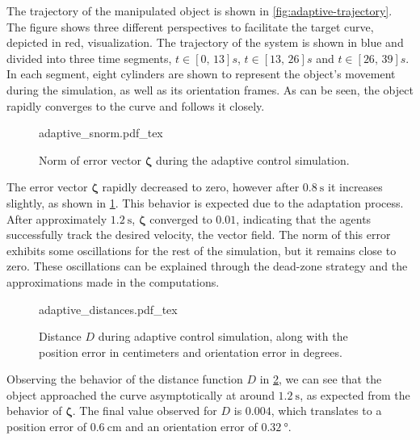 The trajectory of the manipulated object is shown in \cref{fig:adaptive-trajectory}. The figure shows three different perspectives to facilitate the target curve, depicted in red, visualization. The trajectory of the system is shown in blue and divided into three time segments, $t\in[0,\,13]s$, $t\in[13,\,26]s$ and $t\in[26,\,39]s$. In each segment, eight cylinders are shown to represent the object's movement during the simulation, as well as its orientation frames. As can be seen, the object rapidly converges to the curve and follows it closely.

\begin{figure}[ht]
    \centering
    \def\svgwidth{\linewidth}
    {\footnotesize{adaptive_snorm.pdf_tex}}
    \caption{Norm of error vector $\boldsymbol{\zeta}$ during the adaptive control simulation.}
    \label{fig:sim2-snorm}
\end{figure}
The error vector $\boldsymbol{\zeta}$ rapidly decreased to zero, however after $\qty{0.8}{\second}$ it increases slightly, as shown in \cref{fig:sim2-snorm}. This behavior is expected due to the adaptation process. After approximately $\qty{1.2}{\second}$, $\boldsymbol{\zeta}$ converged to $\num{0.01}$, indicating that the agents successfully track the desired velocity, the vector field. The norm of this error exhibits some oscillations for the rest of the simulation, but it remains close to zero. These oscillations can be explained through the dead-zone strategy and the approximations made in the computations.

\begin{figure}[ht]
    \centering
    \def\svgwidth{\linewidth}
    {\footnotesize{adaptive_distances.pdf_tex}}
    \caption{Distance $D$ during adaptive control simulation, along with the position error in centimeters and orientation error in degrees.}
    \label{fig:sim2-distances}
\end{figure}
Observing the behavior of the distance function $D$ in \cref{fig:sim2-distances}, we can see that the object approached the curve asymptotically at around $\qty{1.2}{\second}$, as expected from the behavior of $\boldsymbol{\zeta}$. The final value observed for $D$ is $\num{0.004}$, which translates to a position error of $\qty{0.6}{\centi\meter}$ and an orientation error of $\qty{0.32}{\degree}$.

